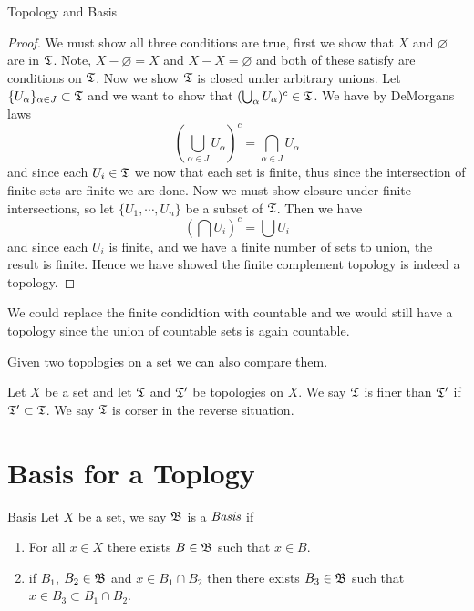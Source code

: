 \begin{chapter}{Topology and Basis}
    
    \begin{proof}
        We must show all three conditions are true, first we show that $X$ and $\varnothing$ are in $\mathfrak{T}$. Note, $X-\varnothing = X$ and $X - X = \varnothing$ and both of 
        these satisfy are conditions on $\mathfrak{T}$. Now we show $\mathfrak{T}$ is closed under arbitrary unions. Let $\{U_\alpha\}_{\alpha \in J} \subset \mathfrak{T}$ and we want to show that 
        $(\bigcup_{\alpha} U_\alpha)^c \in \mathfrak{T}$. We have by DeMorgans laws 
        \[(\bigcup_{\alpha \in J} U_\alpha)^c = \bigcap_{\alpha \in J} U_\alpha \]
        and since each $U_i \in \mathfrak{T}$ we now that each set is finite, thus since the intersection of finite sets are finite we are done. Now we must show closure under finite 
        intersections, so let $\{U_1, \dotsb, U_n \}$ be a subset of $\mathfrak{T}$. Then we have 
        \[(\bigcap U_i)^c = \bigcup U_i \]
        and since each $U_i$ is finite, and we have a finite number of sets to union, the result is finite. Hence we have showed the finite complement topology is indeed a 
        topology. 
    \end{proof}

    We could replace the finite condidtion with countable and we would still have a topology since the union of countable sets is again 
    countable. 

    Given two topologies on a set we can also compare them. 
    
    \begin{defn}
        Let $X$ be a set and let $\mathfrak{T}$ and $\mathfrak{T}^\prime$ be topologies on $X$. We say $\mathfrak{T}$ is finer than $\mathfrak{T}^\prime$ if 
        $\mathfrak{T}^\prime \subset \mathfrak{T}$. We say $\mathfrak{T}$ is corser in the reverse situation. 
    \end{defn}

    \section{Basis for a Toplogy}
    
    \begin{defn}{Basis}
        Let $X$ be a set, we say $\mathfrak{B}$ is a $\emph{Basis}$ if 
        
        \begin{enumerate}
            \item For all $x \in X$ there exists $B \in \mathfrak{B}$ such that $x \in B $.
            \item if $B_1$, $B_2 \in \mathfrak{B}$ and $x \in B_1 \cap B_2$ then there exists $B_3 \in \mathfrak{B}$ such that $x \in B_3 \subset B_1 \cap B_2$. 
        \end{enumerate}


\end{defn}
\end{chapter}

